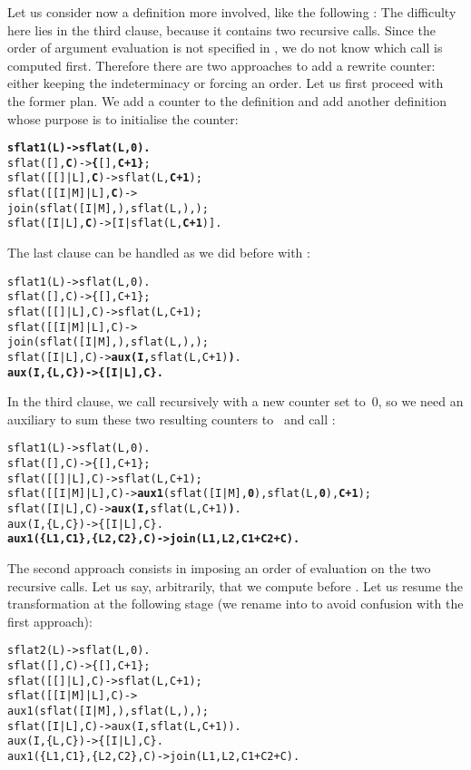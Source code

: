 Let us consider now a definition more involved, like the following
:  The
difficulty here lies in the third clause, because it contains two
recursive calls. Since the order of argument evaluation is not
specified in \Erlang, we do not know which call is computed
first. Therefore there are two approaches to add a rewrite counter:
either keeping the indeterminacy or forcing an order. Let us first
proceed with the former plan. We add a counter to the definition and
add another definition whose purpose is to initialise the counter:
\begin{alltt}
\textbf{sflat1(L)          -> sflat(L,0).}
sflat(       [],\textbf{C}) -> \textbf{\{}[],\textbf{C+1\}};
sflat(   [[]|L],\textbf{C}) -> sflat(L,\textbf{C+1});
sflat([[I|M]|L],\textbf{C}) ->
\hfill join(sflat([I|M],),sflat(L,),);
sflat(    [I|L],\textbf{C}) -> [I|sflat(L,\textbf{C+1})].
\end{alltt}
The last clause can be handled as we did before with
:
\begin{alltt}
sflat1(L)          -> sflat(L,0).
sflat(       [],C) -> \{[],C+1\};
sflat(   [[]|L],C) -> sflat(L,C+1);
sflat([[I|M]|L],C) ->
\hfill join(sflat([I|M],),sflat(L,),);
sflat(    [I|L],C) -> \textbf{aux(I,}sflat(L,C+1)\textbf{)}.
\textbf{aux(I,\{L,C\})       -> \{[I|L],C\}.}
\end{alltt}
In the third clause, we call recursively with a new counter set
to~\(0\), so we need an auxiliary to sum these two resulting counters
to~ and call :
\begin{alltt}
sflat1(L)          -> sflat(L,0).
sflat(       [],C) -> \{[],C+1\};
sflat(   [[]|L],C) -> sflat(L,C+1);
sflat([[I|M]|L],C) -> \textbf{aux1}(sflat([I|M],\textbf{0}),sflat(L,\textbf{0}),\textbf{C+1});
sflat(    [I|L],C) -> \textbf{aux(I,}sflat(L,C+1)\textbf{)}.
aux(I,\{L,C\})            -> \{[I|L],C\}.
\textbf{aux1(\{L1,C1\},\{L2,C2\},C) -> join(L1,L2,C1+C2+C).}
\end{alltt}
The second approach consists in imposing an order of evaluation on the
two recursive calls. Let us say, arbitrarily, that we compute
 before . Let us resume the
transformation at the following stage (we rename  into
 to avoid confusion with the first approach):
\begin{alltt}
sflat2(L)          -> sflat(L,0).
sflat(       [],C) -> \{[],C+1\};
sflat(   [[]|L],C) -> sflat(L,C+1);
sflat([[I|M]|L],C) ->
\hfill aux1(sflat([I|M],),sflat(L,),);
sflat(    [I|L],C) -> aux(I,sflat(L,C+1)).
aux(I,\{L,C\})            -> \{[I|L],C\}.
aux1(\{L1,C1\},\{L2,C2\},C) -> join(L1,L2,C1+C2+C).
\end{alltt}
